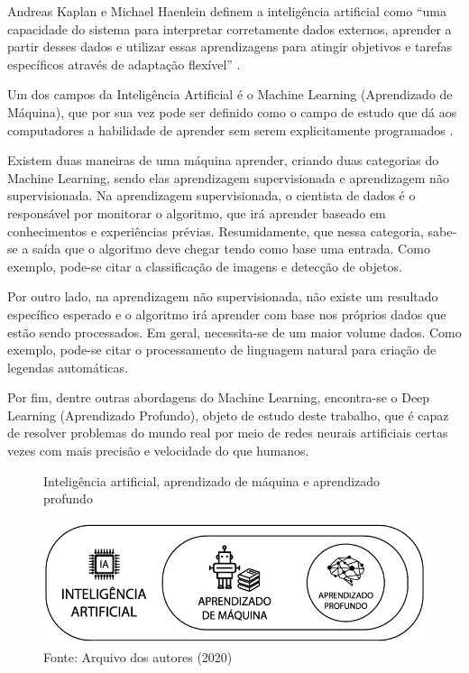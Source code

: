 \par Andreas Kaplan e Michael Haenlein definem a inteligência artificial como “uma capacidade do sistema para interpretar corretamente dados externos, aprender a partir desses dados e utilizar essas aprendizagens para atingir objetivos e tarefas específicos através de adaptação flexível” \cite{Kaplan2019}.

\par Um dos campos da Inteligência Artificial é o Machine Learning (Aprendizado de Máquina), que por sua vez pode ser definido como o campo de estudo que dá aos computadores a habilidade de aprender sem serem explicitamente programados \cite{Samuel1967}.

\par Existem duas maneiras de uma máquina aprender, criando duas categorias do Machine Learning, sendo elas aprendizagem supervisionada e aprendizagem não supervisionada. Na aprendizagem supervisionada, o cientista de dados é o responsável por monitorar o algoritmo, que irá aprender baseado em conhecimentos e experiências prévias. Resumidamente, que nessa categoria, sabe-se a saída que o algoritmo deve chegar tendo como base uma entrada. Como exemplo, pode-se citar a classificação de imagens e detecção de objetos.

\par Por outro lado, na aprendizagem não supervisionada, não existe um resultado específico esperado e o algoritmo irá aprender com base nos próprios dados que estão sendo processados. Em geral, necessita-se de um maior volume dados. Como exemplo, pode-se citar o processamento de linguagem natural para criação de legendas automáticas.

\par Por fim, dentre outras abordagens do Machine Learning, encontra-se o Deep Learning (Aprendizado Profundo), objeto de estudo deste trabalho, que é capaz de resolver problemas do mundo real por meio de redes neurais artificiais certas vezes com mais precisão e velocidade do que humanos.

\begin{figure}[H]
    \centering
    \caption{Inteligência artificial, aprendizado de máquina e aprendizado profundo}
    \includegraphics[width=1.0\linewidth]{Imagens/deep.png}
    \caption*{Fonte: Arquivo dos autores (2020)}
    \label{autoai-results}
\end{figure}

